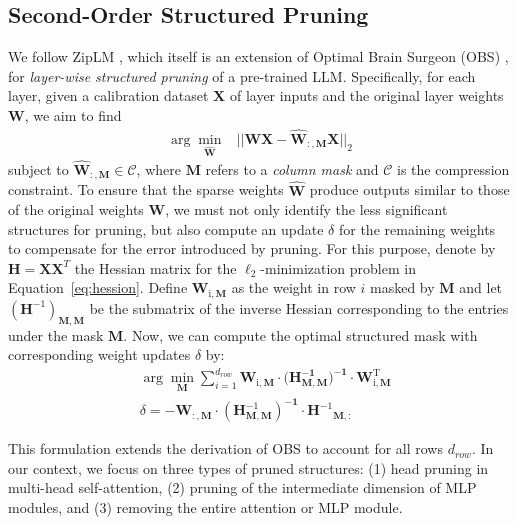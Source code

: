 \subsection{Second-Order Structured Pruning}
\label{sec:method:prune}
We follow ZipLM \citep{kurtic2024ziplm}, which itself is an extension of Optimal Brain Surgeon (OBS) \citep{hassibi1992second, kurtic2022optimal}, for \emph{layer-wise structured pruning} of a pre-trained LLM. Specifically, for each layer, given a calibration dataset $\mathbf{X}$ of layer inputs and the original layer weights $\mathbf{W}$, we aim to find
\begin{align}
    \arg \min_{\mathbf{\hat{W}}} &||\mathbf{WX} - \mathbf{\hat{W}_{:,M}X}||_2 \label{eq:hession}
\end{align}
{subject to} 
    $\mathbf{\hat{W}_{:, M}} \in \mathcal{C}$, where $\mathbf{M}$ refers to a \emph{column mask} and $\mathcal{C}$ is the compression constraint. To ensure that the sparse weights $\mathbf{\hat{W}}$ produce outputs similar to those of the original weights $\mathbf{W}$, we must not only identify the less significant structures for pruning, but also compute an update $\delta$ for the remaining weights to compensate for the error introduced by pruning. For this purpose, denote by $\mathbf{H} = \mathbf{XX}^T$ the Hessian matrix for the $\ell_2$-minimization problem in Equation~\ref{eq:hession}. Define $\mathbf{W_{\mathrm{i},M}}$ as the weight in row $i$ masked by $\mathbf{M}$ and let $(\mathbf{H}^{-1})_{\mathbf{M,M}}$ be the submatrix of the inverse Hessian corresponding to the entries under the mask $\mathbf{M}$. Now, we can compute the optimal structured mask with corresponding weight updates $\delta$ by:
\begin{align}
    &\arg \min_{\mathbf M} \sum_{i=1}^{d_{row}} \mathbf{W_{\mathrm{i}, M} \cdot (\mathbf{H}^{-1}_{\mathbf{M,M}}})^{\mathbf{-1}} \cdot \mathbf{W_{\mathrm{i}, M}^{\mathrm{T}}}\\
    &\delta = - \mathbf{W_{:, M}} \cdot (\mathbf{H}^{-1}_{\mathbf{M,M}})^{\mathbf{-1}} \cdot \mathbf{H^{\mathrm{-1}}}_{\mathbf{M}, :}
\end{align}

This formulation extends the derivation of OBS to account for all rows $d_{row}$. In our context, we focus on three types of pruned structures: (1) head pruning in multi-head self-attention, (2) pruning of the intermediate dimension of MLP modules, and (3) removing the entire attention or MLP module. 


\vspace{-1em}

